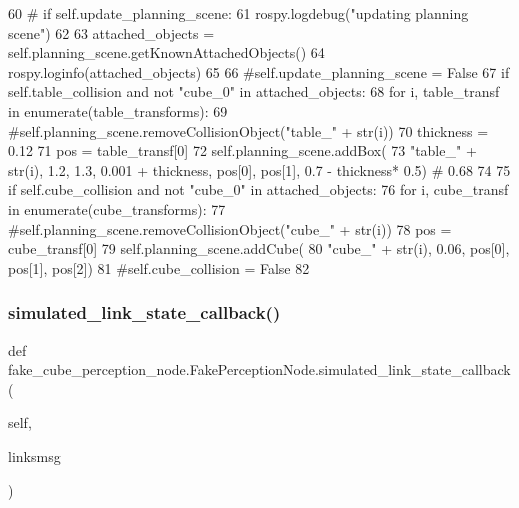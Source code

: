 \begin{DoxyCode}
60             \textcolor{comment}{# if self.update\_planning\_scene:}
61             rospy.logdebug(\textcolor{stringliteral}{"updating planning scene"})
62 
63             attached\_objects = self.planning\_scene.getKnownAttachedObjects()
64             rospy.loginfo(attached\_objects)
65 
66             \textcolor{comment}{#self.update\_planning\_scene = False}
67             \textcolor{keywordflow}{if} self.table\_collision \textcolor{keywordflow}{and} \textcolor{keywordflow}{not} \textcolor{stringliteral}{"cube\_0"} \textcolor{keywordflow}{in} attached\_objects:
68                 \textcolor{keywordflow}{for} i, table\_transf \textcolor{keywordflow}{in} enumerate(table\_transforms):
69                     \textcolor{comment}{#self.planning\_scene.removeCollisionObject("table\_" + str(i))}
70                     thickness = 0.12
71                     pos = table\_transf[0]
72                     self.planning\_scene.addBox(
73                         \textcolor{stringliteral}{"table\_"} + str(i), 1.2, 1.3, 0.001 + thickness, pos[0],  pos[1],  0.7 -  thickness*
      0.5)  \textcolor{comment}{# 0.68}
74 
75             \textcolor{keywordflow}{if} self.cube\_collision \textcolor{keywordflow}{and} \textcolor{keywordflow}{not} \textcolor{stringliteral}{"cube\_0"} \textcolor{keywordflow}{in} attached\_objects:
76                 \textcolor{keywordflow}{for} i, cube\_transf \textcolor{keywordflow}{in} enumerate(cube\_transforms):
77                     \textcolor{comment}{#self.planning\_scene.removeCollisionObject("cube\_" + str(i))}
78                     pos = cube\_transf[0]
79                     self.planning\_scene.addCube(
80                         \textcolor{stringliteral}{"cube\_"} + str(i), 0.06, pos[0],  pos[1],  pos[2])
81                     \textcolor{comment}{#self.cube\_collision = False}
82 
\end{DoxyCode}
\mbox{\label{classfake__cube__perception__node_1_1FakePerceptionNode_ac1127eae8d2eda994b22873529bd198f}} 
\subsubsection{\texorpdfstring{simulated\+\_\+link\+\_\+state\+\_\+callback()}{simulated\_link\_state\_callback()}\hspace{0.1cm}{\footnotesize\ttfamily [3/3]}}
{\footnotesize\ttfamily def fake\+\_\+cube\+\_\+perception\+\_\+node.\+Fake\+Perception\+Node.\+simulated\+\_\+link\+\_\+state\+\_\+callback (\begin{DoxyParamCaption}\item[{}]{self,  }\item[{}]{linksmsg }\end{DoxyParamCaption})}

